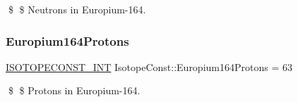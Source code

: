 \$ \$ Neutrons in Europium-\/164. \mbox{\label{group___isotope_const-_europium-_eu164_ga03474db72f9cf2565dbf3d2b919606bc}} 
\subsubsection{\texorpdfstring{Europium164\+Protons}{Europium164Protons}}
{\footnotesize\ttfamily \mbox{\hyperlink{group___isotope_const-_macros_ga5f18360b3e99483a35c32d789e62621c}{I\+S\+O\+T\+O\+P\+E\+C\+O\+N\+S\+T\+\_\+\+I\+NT}} Isotope\+Const\+::\+Europium164\+Protons = 63}

\$ \$ Protons in Europium-\/164. 